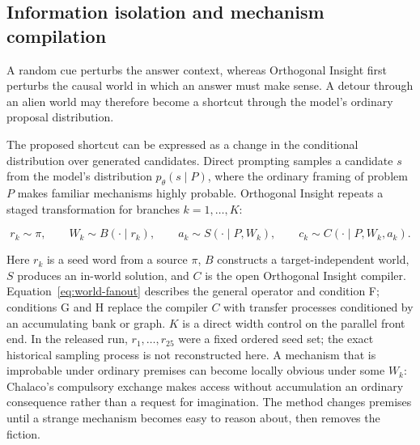 \documentclass[11pt,a4paper]{article}
\begin{document}
\subsection{Information isolation and mechanism compilation}
\label{sec:isolation}

A random cue perturbs the answer context, whereas Orthogonal Insight first perturbs the causal world in which an answer must make sense. A detour through an alien world may therefore become a shortcut through the model's ordinary proposal distribution.

The proposed shortcut can be expressed as a change in the conditional distribution over generated candidates. Direct prompting samples a candidate $s$ from the model's distribution $p_\theta(s\mid P)$, where the ordinary framing of problem $P$ makes familiar mechanisms highly probable. Orthogonal Insight repeats a staged transformation for branches $k=1,\ldots,K$:

\begin{equation}
r_k\sim\pi,\qquad
W_k\sim B(\cdot\mid r_k),\qquad
a_k\sim S(\cdot\mid P,W_k),\qquad
c_k\sim C(\cdot\mid P,W_k,a_k).
\label{eq:world-fanout}
\end{equation}

Here $r_k$ is a seed word from a source $\pi$, $B$ constructs a target-independent world, $S$ produces an in-world solution, and $C$ is the open Orthogonal Insight compiler. Equation~\ref{eq:world-fanout} describes the general operator and condition F; conditions G and H replace the compiler $C$ with transfer processes conditioned by an accumulating bank or graph. $K$ is a direct width control on the parallel front end. In the released run, $r_1,\ldots,r_{25}$ were a fixed ordered seed set; the exact historical sampling process is not reconstructed here. A mechanism that is improbable under ordinary premises can become locally obvious under some $W_k$: Chalaco's compulsory exchange makes access without accumulation an ordinary consequence rather than a request for imagination. The method changes premises until a strange mechanism becomes easy to reason about, then removes the fiction.
\end{document}
